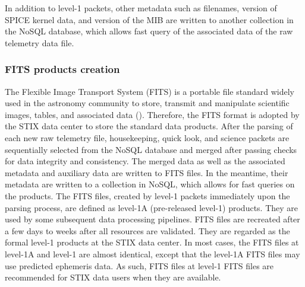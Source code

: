 \documentclass[referee]{aa} %
\begin{document}
In addition to level-1 packets,  other metadata such as filenames, version of SPICE kernel data, and version of the MIB are written to another collection in the NoSQL database, which allows fast query of the associated data of the raw telemetry data file.

\subsubsection{FITS products creation}
The Flexible Image Transport System (FITS) is a portable file standard widely used in the astronomy community to store, transmit and manipulate scientific images, tables, and associated data (\cite{fits}).  
Therefore, the FITS format is adopted by the STIX data center to store the standard data products. 
After the parsing of each new raw telemetry file, housekeeping, quick look, and science packets are sequentially selected from the NoSQL database and merged after passing checks for data integrity and consistency.  The merged data as well as the associated metadata and auxiliary data are written to FITS files.  In the meantime, their metadata are written to a collection in NoSQL, which allows for fast queries on the products. The FITS files, created by level-1 packets immediately upon the parsing process, are defined as level-1A (pre-released level-1) products.  They are used by some subsequent data processing pipelines.  
FITS files are recreated after a few days to weeks after all resources are validated.
They are regarded as the formal level-1 products at the STIX data center. 
In most cases, the FITS files at level-1A and level-1 are almost identical, except that the level-1A FITS files may use predicted ephemeris data. As such, FITS files at level-1 FITS files are recommended for STIX data users when they are available. 
\end{document}
